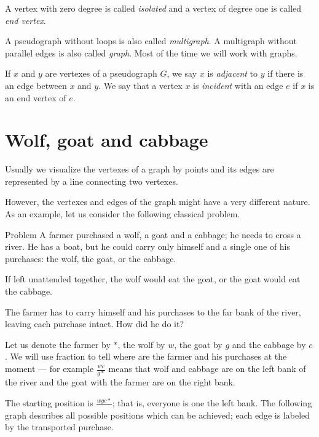 A vertex with zero degree is called \emph{isolated} and a vertex of degree one is called \emph{end vertex}.

\smallskip

A pseudograph without loops is also called \emph{multigraph}.
A multigraph without parallel edges is also called \emph{graph}.
Most of the time we will work with graphs.

If $x$ and $y$ are vertexes of a pseudograph $G$, we say $x$ is \emph{adjacent} to $y$ if there is an edge between $x$ and $y$.
We say that a vertex $x$ is \emph{incident} with an edge $e$ if $x$ is an end vertex of $e$.

\section*{Wolf, goat and cabbage}

Usually we visualize the vertexes of a graph by points
and its edges are represented by a line connecting two vertexes.

However, the vertexes and edges of the graph might have a very different nature.
As an example, let us consider the following classical problem.

\begin{thm}{Problem}
A farmer purchased a wolf, a goat and a cabbage;
he needs to cross a river.
He has a boat, but he could carry only himself and a single one of his purchases: the wolf, the goat, or the cabbage.

If left unattended together, the wolf would eat the goat, or the goat would eat the cabbage.

The farmer has to carry himself and his purchases to the far bank of the river, leaving each purchase intact. How did he do it?
\end{thm}

Let us denote the farmer by $*$,
the wolf by $w$, the goat by $g$ and the cabbage by $c$.
We will use fraction to tell where are the farmer and his purchases at the moment ---
for example $\tfrac{wc}{g{*}}$ means that wolf and cabbage are on the left bank of the river and the goat with the farmer are on the right bank.

The starting position is $\tfrac{wgc{*}}{}$; that is, everyone is one the left bank.
The following graph describes all possible positions which can be achieved; each edge is labeled by the transported purchase.

